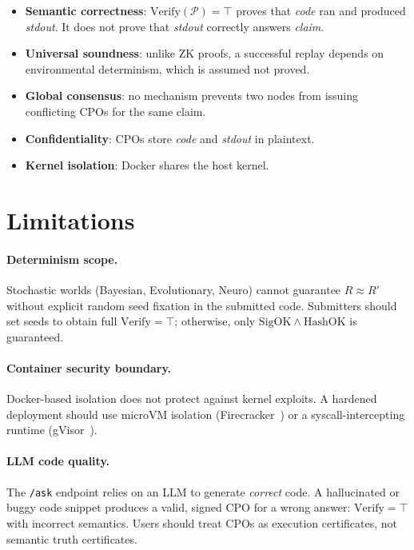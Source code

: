 \documentclass[11pt]{article}
\begin{document}
\begin{itemize}
  \item \textbf{Semantic correctness}: $\mathrm{Verify}(\mathcal{P}) = \top$
        proves that \textit{code} ran and produced \textit{stdout}.  It does
        not prove that \textit{stdout} correctly answers \textit{claim}.
  \item \textbf{Universal soundness}: unlike ZK proofs, a successful replay
        depends on environmental determinism, which is assumed not proved.
  \item \textbf{Global consensus}: no mechanism prevents two nodes from
        issuing conflicting CPOs for the same claim.
  \item \textbf{Confidentiality}: CPOs store \textit{code} and
        \textit{stdout} in plaintext.
  \item \textbf{Kernel isolation}: Docker shares the host kernel.
\end{itemize}

\section{Limitations}
\label{sec:limitations}

\paragraph{Determinism scope.}
Stochastic worlds (Bayesian, Evolutionary, Neuro) cannot guarantee
$R \approx R'$ without explicit random seed fixation in the submitted code.
Submitters should set seeds to obtain full $\mathrm{Verify} = \top$;
otherwise, only $\mathrm{SigOK} \land \mathrm{HashOK}$ is guaranteed.

\paragraph{Container security boundary.}
Docker-based isolation does not protect against kernel exploits.  A hardened
deployment should use microVM isolation (Firecracker~\citep{firecracker}) or
a syscall-intercepting runtime (gVisor~\citep{gvisor}).

\paragraph{LLM code quality.}
The \texttt{/ask} endpoint relies on an LLM to generate \emph{correct} code.
A hallucinated or buggy code snippet produces a valid, signed CPO for a
wrong answer: $\mathrm{Verify} = \top$ with incorrect semantics.  Users
should treat CPOs as execution certificates, not semantic truth certificates.
\end{document}
